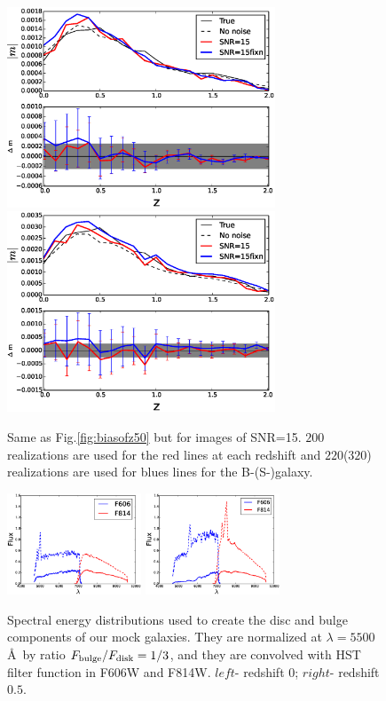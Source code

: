 \documentclass[useAMS,usenatbib]{mn2e}
\begin{document}
\begin{figure}
  \includegraphics[width=8.0cm]{zs2n_b_snrtt15.eps}
  \includegraphics[width=8.0cm]{zs2n_s_snrtt15.eps}
\caption{Same as Fig.\ref{fig:biasofz50} but for images of SNR=15.
  $200$ realizations are used for the red lines at each redshift and
  $220$($320$) realizations are used for blues lines for the
  B-(S-)galaxy. }
\label{fig:biasofz15}
\end{figure}

%
\begin{figure}
\centerline{\includegraphics[width=4.0cm]{z0bandsed.eps}
\includegraphics[width=4.0cm]{z5bandsed.eps}}
\caption{Spectral energy distributions used to create the disc and
  bulge components of our mock galaxies. They are normalized at
  $\lambda=5500$\AA$\,$ by ratio $F_{\rm bulge}/F_{\rm disk}=1/3$, and they
  are convolved with HST filter function in F606W and F814W. $left$-
  redshift $0$; $right$- redshift $0.5$.}
\label{fig:sedz}
\end{figure}
\end{document}
